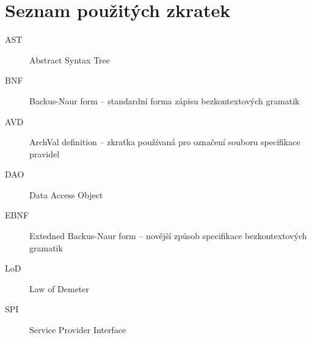 \chapter{Seznam použitých zkratek}

\begin{description}
\item[AST] Abstract Syntax Tree
\item[BNF] Backus-Naur form -- standardní forma zápisu bezkontextových gramatik
\item[AVD] ArchVal definition -- zkratka používaná pro označení souboru specifikace pravidel
\item[DAO] Data Access Object
\item[EBNF] Extedned Backus-Naur form -- novější způsob specifikace bezkontextových gramatik
\item[LoD] Law of Demeter
\item[SPI] Service Provider Interface
\end{description}
